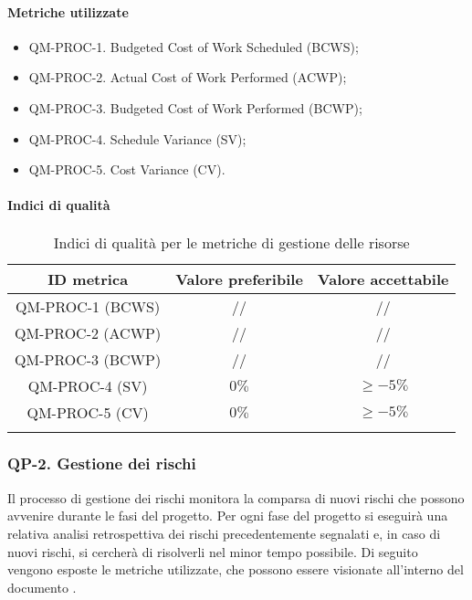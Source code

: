 		\paragraph{Metriche utilizzate}

			\begin{itemize}
				\item QM-PROC-1. Budgeted Cost of Work Scheduled (BCWS);
				\item QM-PROC-2. Actual Cost of Work Performed (ACWP);
				\item QM-PROC-3. Budgeted Cost of Work Performed (BCWP);
				\item QM-PROC-4. Schedule Variance (SV);
				\item QM-PROC-5. Cost Variance (CV).
			\end{itemize}

		\paragraph{Indici di qualità}

			\begin{center}
				\begin{longtable}{|c|c|c|}
				\hline
				\rowcolor{lighter-grayer}
				\textbf{ID metrica} & \textbf{Valore preferibile} & \textbf{Valore accettabile}\\
				\hline
				\endfirsthead
				\hline
				QM-PROC-1 (BCWS) & // & // \\
				\hline
				QM-PROC-2 (ACWP) & // & // \\
				\hline
				QM-PROC-3 (BCWP) & // & // \\
				\hline
				QM-PROC-4 (SV) & \(0\%\) & \(\ge -5\%\) \\
				\hline
				QM-PROC-5 (CV) & \(0\%\) & \(\ge -5\%\) \\
				\hline
				\caption{Indici di qualità per le metriche di gestione delle risorse}
				\end{longtable}
			\end{center}

	\subsubsection{QP-2. Gestione dei rischi}

		Il processo di gestione dei rischi monitora la comparsa di nuovi rischi che possono avvenire durante le fasi del progetto.
		Per ogni fase del progetto si eseguirà una relativa analisi retrospettiva dei rischi precedentemente segnalati e, in caso di nuovi rischi, si cercherà di risolverli nel minor tempo possibile.
		Di seguito vengono esposte le metriche utilizzate, che possono essere visionate all'interno del documento .

